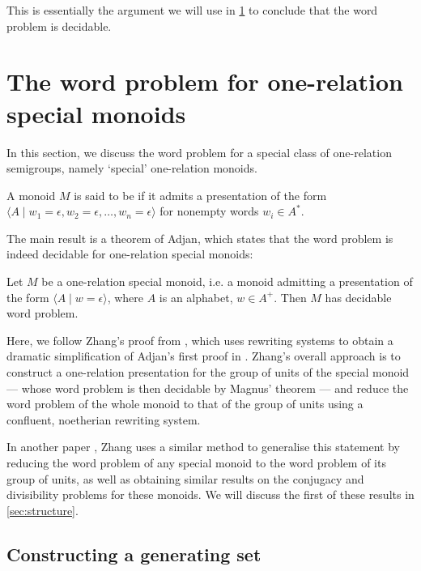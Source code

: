 \documentclass[noindex,noinsetproof,emphthm,12pt]{lmaths}
\begin{document}
This is essentially the argument we will use in \cref{sec:special-monoids} to conclude that the word problem is decidable.

\section{The word problem for one-relation special monoids} \label{sec:special-monoids}

In this section, we discuss the word problem for a special class of one-relation semigroups, namely `special' one-relation monoids.

\begin{defn} \label{def:special}
	A monoid $M$ is said to be  if it admits a presentation of the form $\langle A \mid w_1 = \epsilon, w_2 = \epsilon, \ldots, w_n = \epsilon \rangle$ for nonempty words $w_i \in A^*$.
\end{defn}

The main result is a theorem of Adjan, which states that the word problem is indeed decidable for one-relation special monoids:

\begin{theorem}[Adjan] \label{thm:ors-decidablewp}
	Let $M$ be a one-relation special monoid, i.e. a monoid admitting a presentation of the form $\langle A \mid w = \epsilon\rangle$, where $A$ is an alphabet, $w \in A^+$. Then $M$ has decidable word problem.
\end{theorem}

Here, we follow Zhang's proof from \cite{Zhang1992a}, which uses rewriting systems to obtain a dramatic simplification of Adjan's first proof in \cite{Adian1966}. Zhang's overall approach is to construct a one-relation presentation for the group of units of the special monoid --- whose word problem is then decidable by Magnus' theorem --- and reduce the word problem of the whole monoid to that of the group of units using a confluent, noetherian rewriting system.

In another paper \cite{Zhang1992}, Zhang uses a similar method to generalise this statement by reducing the word problem of any special monoid to the word problem of its group of units, as well as obtaining similar results on the conjugacy and divisibility problems for these monoids. We will discuss the first of these results in \cref{sec:structure}.


\subsection{Constructing a generating set} \label{sec:constructing-genset}
\end{document}

